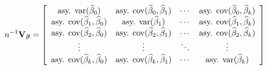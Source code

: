 \documentclass{article}%
\begin{document}
\bigskip%

\[
n^{-1}\mathbf{V}_{\boldsymbol{\beta}}=\left[
\begin{array}
[c]{cccc}%
\text{asy. var}(\widehat{\beta}_{0}) & \text{asy. cov}(\widehat{\beta}%
_{0},\widehat{\beta}_{1}) & \cdots & \text{asy. cov}(\widehat{\beta}%
_{0},\widehat{\beta}_{k})\\
\text{asy. cov}(\widehat{\beta}_{1},\widehat{\beta}_{0}) & \text{asy.
var}(\widehat{\beta}_{1}) & \cdots & \text{asy. cov}(\widehat{\beta}%
_{1},\widehat{\beta}_{k})\\
\text{asy. cov}(\widehat{\beta}_{2},\widehat{\beta}_{0}) & \text{asy.
cov}(\widehat{\beta}_{2},\widehat{\beta}_{1}) & \cdots & \text{asy.
cov}(\widehat{\beta}_{2},\widehat{\beta}_{k})\\
\vdots & \vdots & \ddots & \vdots\\
\text{asy. cov}(\widehat{\beta}_{k},\widehat{\beta}_{0}) & \text{asy.
cov}(\widehat{\beta}_{k},\widehat{\beta}_{1}) & \cdots & \text{asy.
var}(\widehat{\beta}_{k})
\end{array}
\right]
\]
\end{document}
